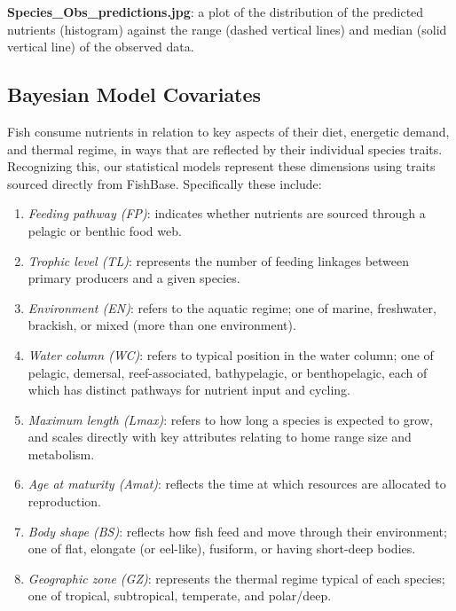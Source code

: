 \documentclass{article}
\begin{document}
{\bf Species\_Obs\_predictions.jpg}:  a plot of the distribution of the predicted nutrients (histogram) against the range (dashed vertical lines) and median (solid vertical line) of the observed data.

\subsection{Bayesian Model Covariates}

Fish consume nutrients in relation to key aspects of their diet, energetic demand, and thermal regime, in ways that are reflected by their individual species traits. Recognizing this, our statistical models represent these dimensions using traits sourced directly from FishBase. Specifically these include:

\begin{enumerate}
\item {\it Feeding pathway (FP)}: indicates whether nutrients are sourced through a pelagic or benthic food web.\\
\item {\it Trophic level (TL)}: represents the number of feeding linkages between primary producers and a given species.\\
\item {\it Environment (EN)}: refers to the aquatic regime; one of marine, freshwater, brackish, or mixed (more than one environment).\\
\item {\it Water column (WC)}: refers to typical position in the water column; one of pelagic, demersal, reef-associated, bathypelagic, or benthopelagic, each of which has distinct pathways for nutrient input and cycling.\\
\item {\it Maximum length (Lmax)}: refers to how long a species is expected to grow, and scales directly with key attributes relating to home range size and metabolism.\\
\item {\it Age at maturity (Amat)}: reflects the time at which resources are allocated to reproduction.\\
\item {\it Body shape (BS)}:  reflects how fish feed and move through their environment; one of flat, elongate (or eel-like), fusiform, or having short-deep bodies.\\
\item {\it Geographic zone (GZ)}: represents the thermal regime typical of each species; one of tropical, subtropical, temperate, and polar/deep.
\end{enumerate}
\end{document}
